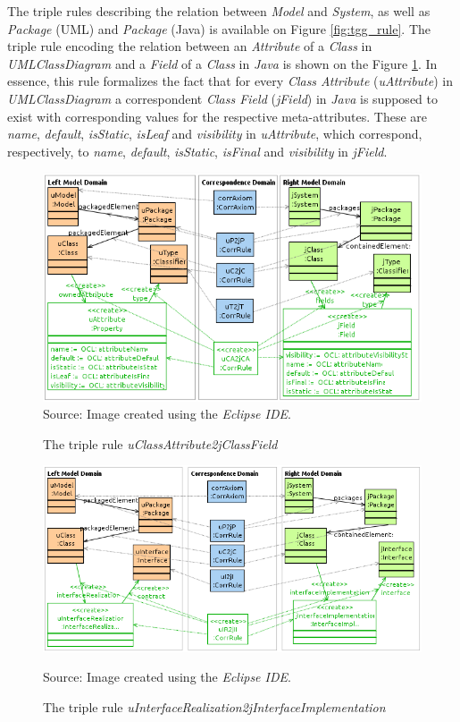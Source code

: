 \documentclass[tuberlin,cic,tc,english,noabntcite, oneside]{iiufrgs}
\begin{document}
The triple rules describing the relation between \emph{Model} and \emph{System}, as well as \emph{Package} (UML) and \emph{Package} (Java) is available on Figure \ref{fig:tgg_rule}. The triple rule encoding the relation between an \emph{Attribute} of a \emph{Class} in \emph{UMLClassDiagram} and a \emph{Field} of a \emph{Class} in \emph{Java} is shown on the Figure \ref{fig:uCAttribute2jCField}. In essence, this rule formalizes the fact that for every \emph{Class Attribute} (\emph{uAttribute}) in \emph{UMLClassDiagram} a correspondent \emph{Class Field} (\emph{jField}) in \emph{Java} is supposed to exist with corresponding values for the respective meta-attributes. These are \emph{name}, \emph{default}, \emph{isStatic}, \emph{isLeaf} and \emph{visibility} in \emph{uAttribute}, which correspond, respectively, to \emph{name}, \emph{default}, \emph{isStatic}, \emph{isFinal} and \emph{visibility} in \emph{jField}.

\begin{figure}[H]
	\centering
    \caption{The triple rule \emph{uClassAttribute2jClassField}}
    \includegraphics[width=\textwidth]{uCAttribute2jCField} \\
    Source: Image created using the \emph{Eclipse IDE}.
    \label{fig:uCAttribute2jCField}
\end{figure}

\begin{figure}[H]
	\centering
    \caption{The triple rule \emph{uInterfaceRealization2jInterfaceImplementation}}
    \includegraphics[width=\textwidth]{uIRealization2jIImplementation} \par
    Source: Image created using the \emph{Eclipse IDE}.
    \label{fig:uIRealization2jIImplementation}
\end{figure}
\end{document}
